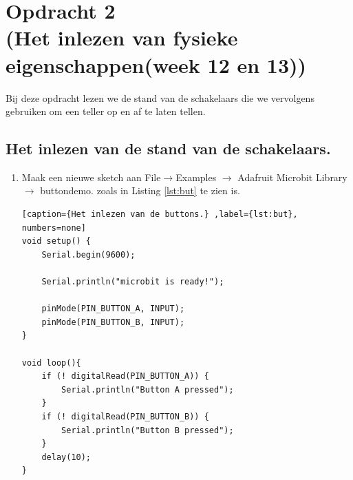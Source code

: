 \chapter{Opdracht 2\\  \small (Het inlezen van fysieke eigenschappen(week 12 en 13))} \label{sec:but}


Bij deze opdracht lezen we de stand van de schakelaars die we vervolgens gebruiken om een teller op en af te laten tellen.

\section{Het inlezen van de stand van de schakelaars.}\label{sec:but}
\begin{enumerate}[label=\alph*)]
	\item 
Maak een nieuwe sketch aan File$\rightarrow$Examples $\rightarrow$ Adafruit Microbit Library $\rightarrow$ buttondemo. zoals in Listing \ref{lst:but} te zien is.

\begin{lstlisting}[caption={Het inlezen van de buttons.} ,label={lst:but}, numbers=none]
void setup() {  
	Serial.begin(9600);
	
	Serial.println("microbit is ready!");
	
	pinMode(PIN_BUTTON_A, INPUT);
	pinMode(PIN_BUTTON_B, INPUT);
}

void loop(){
	if (! digitalRead(PIN_BUTTON_A)) {
		Serial.println("Button A pressed");
	}
	if (! digitalRead(PIN_BUTTON_B)) {
		Serial.println("Button B pressed");
	}
	delay(10);
}
\end{lstlisting}


\end{enumerate}
